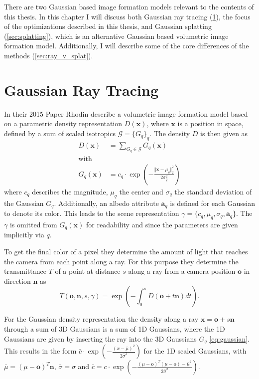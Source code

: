 \documentclass[a4paper, 11pt]{memoir}
\begin{document}
    There are two Gaussian based image formation models relevant to the contents of this thesis. In this chapter I will
    discuss both Gaussian ray tracing (\ref{sec:int_grt}), the focus of the optimizations described in this thesis, and Gaussian
    splatting (\ref{sec:splatting}), which is an alternative Gaussian based volumetric image formation model. Additionally,
    I will describe some of the core differences of the methods (\ref{sec:ray_v_splat}).

    \section{Gaussian Ray Tracing}
    \label{sec:int_grt}
    In their 2015 Paper \cite{Rhodin:2015} Rhodin \etal describe a volumetric image formation
    model based on a parametric density representation $D(\mathbf{x})$, where $\mathbf{x}$ is a position in space,
    defined by a sum of scaled \gls{isotropic}s $\mathcal{G} = \{ G_q \}_q$. The density $D$ is then given as
    \begin{align}
        D(\mathbf{x}) &= \sum_{G_q \in \mathcal{G}} G_q(\mathbf{x})
        \label{eq:density}\\
        \text{with} \nonumber\\
        G_q(\mathbf{x}) &= c_q \cdot \exp{\left( - \frac{\Vert\mathbf{x} - \mu_q\Vert_2^2}{2\sigma_q^2} \right)}
        \label{eq:gaussian}
    \end{align}
    where $c_q$ describes the magnitude, $\mu_q$ the center and $\sigma_q$ the standard deviation of the Gaussian $G_q$.
    Additionally, an \gls{albedo} attribute $\mathbf{a}_q$ is defined for each Gaussian to denote its color. This leads
    to the scene representation $\gamma = \{ c_q, \mu_q, \sigma_q, \mathbf{a}_q \}$. The $\gamma$ is omitted from
    $G_q(\mathbf{x})$ for readability and since the parameters are given implicitly via $q$.

    To get the final color of a pixel they determine the amount of light that reaches the camera from each point
    along a ray. For this purpose they determine the \gls{transmittance} $T$ of a point at distance $s$ along a ray from
    a camera position $\mathbf{o}$ in direction $\mathbf{n}$ as
    \begin{equation}
        T(\mathbf{o}, \mathbf{n}, s, \gamma) = \exp{\left( - \int_0^s D(\mathbf{o} + t\mathbf{n}) dt \right)}.
        \label{eq:transmittance}
    \end{equation}

    For the Gaussian density representation the density along a ray $\mathbf{x} = \mathbf{o} + s\mathbf{n}$ through a
    sum of 3D Gaussians is a sum of 1D Gaussians, where the 1D Gaussians are given by inserting the ray into the
    3D Gaussians $G_q$ \eqref{eq:gaussian}. This results in the form
    $\bar{c} \cdot \exp{\left( - \frac{(x - \bar{\mu})^2}{2\bar{\sigma}^2} \right)}$ for the 1D scaled Gaussians, with
    $\bar{\mu} = (\mu - \mathbf{o})^T\mathbf{n}$, $\bar{\sigma} = \sigma$ and
    $\bar{c} = c \cdot \exp{\left( - \frac{(\mu - \mathbf{o})^T(\mu - \mathbf{o}) - \bar{\mu}^2}{2\bar{\sigma}^2} \right)}$.
\end{document}
